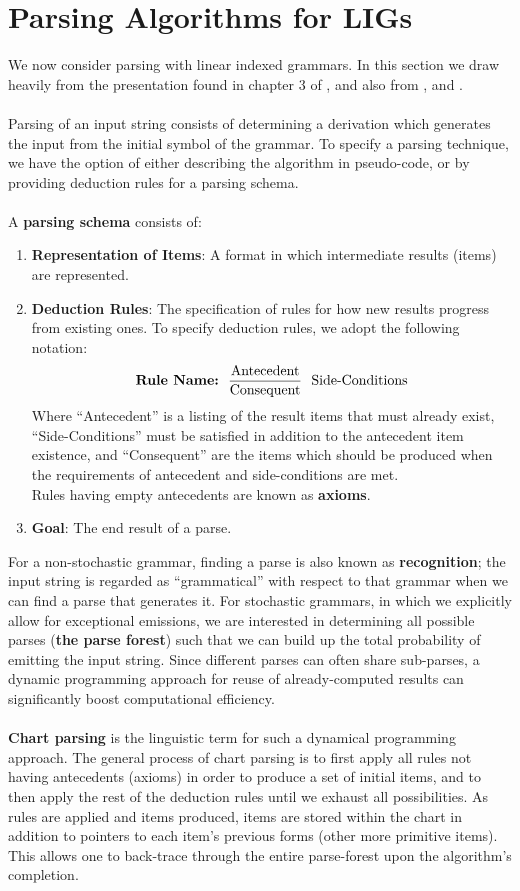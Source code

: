 \documentclass[11pt]{article}
\begin{document}
\section {Parsing Algorithms for LIGs}
We now consider parsing with linear indexed grammars. In this section we draw heavily from the presentation
found in chapter 3 of \cite{Kallmeyer2010}, and also from \cite{Sikkel1994}, \cite{Sikkel1998} and \cite{Vijay-Shanker1993}. \\ \\
Parsing of an input string consists of determining a derivation which generates the input from the initial
symbol of the grammar. To specify a parsing technique, we have the option of
either describing the algorithm in pseudo-code, or by providing deduction rules for a parsing schema. \\ \\
A {\bf parsing schema} consists of:
\begin {enumerate}
 \item {\bf Representation of \bf Items}: A format in which intermediate results (items) are represented.
 \item {\bf Deduction Rules}: The specification of rules for how new results progress from existing ones.
To specify deduction rules, we adopt the following notation:
\[
\text{{\bf Rule Name:}} \ \ \frac{\text{Antecedent}}{\text{Consequent}} \ \ {\text{Side-Conditions}}
\]
Where ``Antecedent'' is a listing of the result items that must already exist, ``Side-Conditions'' must be
satisfied in addition to the antecedent item existence, and ``Consequent'' are the items which should be
produced when the requirements of antecedent and side-conditions are met.\\
Rules having empty antecedents are known as {\bf axioms}.
 \item {\bf Goal}: The end result of a parse.
\end {enumerate}
For a non-stochastic grammar, finding a parse is also known as {\bf recognition};
the input string is regarded as ``grammatical'' with respect to that grammar when we can
find a parse that generates it. For stochastic grammars, in which we explicitly allow for
exceptional emissions, we are interested in determining all possible parses ({\bf the parse forest})
such that we can build up the total probability of emitting the input string.
Since different parses can often share sub-parses, a dynamic programming approach
for reuse of already-computed results can significantly boost computational efficiency. \\ \\
{\bf Chart parsing} is the linguistic term for such a dynamical programming approach.
The general process of chart parsing is to first apply all rules not having antecedents (axioms)
in order to produce a set of initial items, and to then apply the rest of the deduction rules until
we exhaust all possibilities.
As rules are applied and items produced, items are stored within the chart 
in addition to pointers to each item's previous forms (other more primitive items).
This allows one to back-trace through the entire parse-forest upon the algorithm's completion.\\ \\
\end{document}
